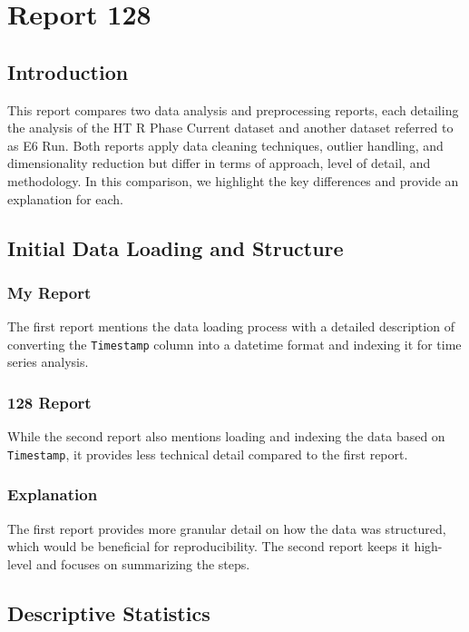 \section{Report 128}

\subsection*{Introduction}

This report compares two data analysis and preprocessing reports, each detailing the analysis of the HT R Phase Current dataset and another dataset referred to as E6 Run. Both reports apply data cleaning techniques, outlier handling, and dimensionality reduction but differ in terms of approach, level of detail, and methodology. In this comparison, we highlight the key differences and provide an explanation for each.

\subsection*{Initial Data Loading and Structure}

\subsubsection*{My Report}
The first report mentions the data loading process with a detailed description of converting the \texttt{Timestamp} column into a datetime format and indexing it for time series analysis.

\subsubsection*{128 Report}
While the second report also mentions loading and indexing the data based on \texttt{Timestamp}, it provides less technical detail compared to the first report.

\subsubsection*{Explanation}
The first report provides more granular detail on how the data was structured, which would be beneficial for reproducibility. The second report keeps it high-level and focuses on summarizing the steps.

\subsection*{Descriptive Statistics}

